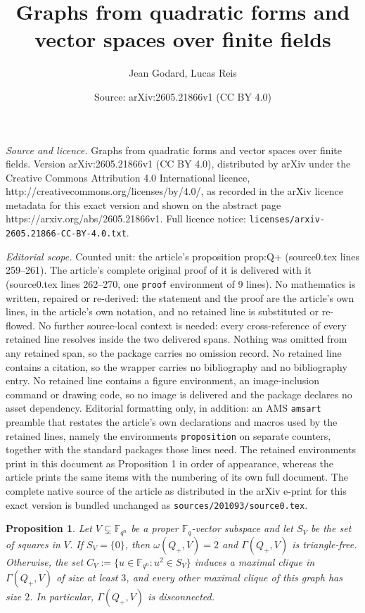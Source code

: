 \documentclass[10pt,a4paper]{amsart}
\title{Graphs from quadratic forms and vector spaces over finite fields}
\author{Jean Godard, Lucas Reis}
\date{Source: arXiv:2605.21866v1 (CC BY 4.0)}
\newtheorem{proposition}{Proposition}
\newcommand{\F}{\mathbb F}
\newcommand{\G}{\Gamma}
\begin{document}
\maketitle

\noindent\emph{Source and licence.} Graphs from quadratic forms and vector spaces over finite fields. Version arXiv:2605.21866v1 (CC BY 4.0), distributed by arXiv under the Creative Commons Attribution 4.0 International licence, http://creativecommons.org/licenses/by/4.0/, as recorded in the arXiv licence metadata for this exact version and shown on the abstract page https://arxiv.org/abs/2605.21866v1. Full licence notice: \texttt{licenses/arxiv-2605.21866-CC-BY-4.0.txt}.\par\smallskip

\noindent\textit{Editorial scope.} Counted unit: the article's proposition prop:Q+ (source0.tex lines 259--261). The article's complete original proof of it is delivered with it (source0.tex lines 262--270, one \texttt{proof} environment of 9 lines). No mathematics is written, repaired or re-derived: the statement and the proof are the article's own lines, in the article's own notation, and no retained line is substituted or re-flowed.  No further source-local context is needed: every cross-reference of every retained line resolves inside the two delivered spans.  Nothing was omitted from any retained span, so the package carries no omission record.  No retained line contains a citation, so the wrapper carries no bibliography and no bibliography entry.  No retained line contains a figure environment, an image-inclusion command or drawing code, so no image is delivered and the package declares no asset dependency.  Editorial formatting only, in addition: an AMS \texttt{amsart} preamble that restates the article's own declarations and macros used by the retained lines, namely the environments \texttt{proposition} on separate counters, together with the standard packages those lines need.  The retained environments print in this document as Proposition 1 in order of appearance, whereas the article prints the same items with the numbering of its own full document.  The complete native source of the article as distributed in the arXiv e-print for this exact version is bundled unchanged as \texttt{sources/201093/source0.tex}.
\begin{proposition}\label{prop:Q+}
    Let $V\subsetneq \F_{q^n}$ be a proper $\F_q$-vector subspace and let $S_V$ be the set of squares in $V$. If $S_V=\{0\}$, then $\omega(Q_+, V)=2$ and $\G(Q_+, V)$ is triangle-free. Otherwise, the set $C_V:=\{u\in \F_{q^n}: u^2\in S_V\}$ induces a maximal clique in $\Gamma(Q_+, V)$ of size at least $3$, and every other maximal clique of this graph has size $2$. In particular, $\Gamma(Q_+, V)$ is disconnected.
\end{proposition}
\end{document}
